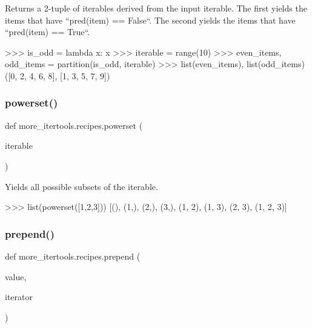 \begin{DoxyVerb}Returns a 2-tuple of iterables derived from the input iterable.
The first yields the items that have ``pred(item) == False``.
The second yields the items that have ``pred(item) == True``.

    >>> is_odd = lambda x: x %
    >>> iterable = range(10)
    >>> even_items, odd_items = partition(is_odd, iterable)
    >>> list(even_items), list(odd_items)
    ([0, 2, 4, 6, 8], [1, 3, 5, 7, 9])\end{DoxyVerb}
 \mbox{\label{namespacemore__itertools_1_1recipes_a12a76688001a6778691bb8174aea0bcf}} 
\subsubsection{\texorpdfstring{powerset()}{powerset()}}
{\footnotesize\ttfamily def more\+\_\+itertools.\+recipes.\+powerset (\begin{DoxyParamCaption}\item[{}]{iterable }\end{DoxyParamCaption})}

\begin{DoxyVerb}Yields all possible subsets of the iterable.

    >>> list(powerset([1,2,3]))
    [(), (1,), (2,), (3,), (1, 2), (1, 3), (2, 3), (1, 2, 3)]\end{DoxyVerb}
 \mbox{\label{namespacemore__itertools_1_1recipes_a41254019483516268635407b58e620c5}} 
\subsubsection{\texorpdfstring{prepend()}{prepend()}}
{\footnotesize\ttfamily def more\+\_\+itertools.\+recipes.\+prepend (\begin{DoxyParamCaption}\item[{}]{value,  }\item[{}]{iterator }\end{DoxyParamCaption})}

